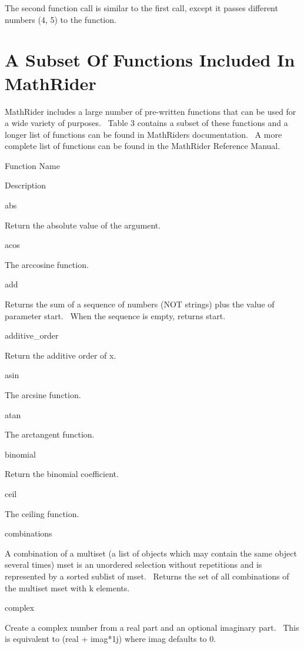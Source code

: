 \documentclass[12pt,twoside]{book}
\begin{document}
\bigskip

The second function call is similar to the first call, except it passes
different numbers (4, 5) to the function.

\section[A Subset Of Functions Included In MathRider]{A
Subset Of Functions Included In MathRider}
MathRider includes a large number of pre{}-written functions that can be
used for a wide variety of purposes. \ Table 3 contains a subset of
these functions and a longer list of functions can be found in
MathRider{\textquotesingle}s documentation. \ A more complete list of
functions can be found in the MathRider Reference Manual.

Function Name

Description

abs

Return the absolute value of the argument.

acos

The arccosine function.

add

Returns the sum of a sequence of numbers (NOT strings) plus the value of
parameter {\textquotesingle}start{\textquotesingle}. \ When the
sequence is empty, returns start.

additive\_order

Return the additive order of x.

asin 

The arcsine function.

atan

The arctangent function.

binomial

Return the binomial coefficient.

ceil

The ceiling function.

combinations

A combination of a multiset (a list of objects which may contain the
same object several times) mset is an unordered selection without
repetitions and is represented by a sorted sublist of mset. \ Returns
the set of all combinations of the multiset mset with k elements.

complex

Create a complex number from a real part and an optional imaginary part.
\ This is equivalent to (real + imag*1j) where imag defaults to 0.
\end{document}
